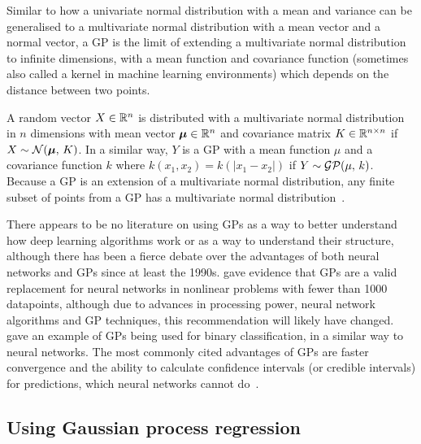 Similar to how a univariate normal distribution with a mean and variance can be generalised to a multivariate normal distribution with a mean vector and a normal vector, a \ac{GP} is the limit of extending a multivariate normal distribution to infinite dimensions, with a mean function and covariance function (sometimes also called a kernel in machine learning environments) which depends on the distance between two points.

A random vector \(X \in \mathbb{R}{}^n\) is distributed with a multivariate normal distribution in \(n\) dimensions with mean vector \(\bm{\mu} \in \mathbb{R}{}^n\) and covariance matrix \(K \in \mathbb{R}^{n \times n}\) if \(X \sim \mathcal{N}(\bm{\mu},\, K)\).
In a similar way, \(Y\) is a \ac{GP} with a mean function \(\mu\) and a covariance function \(k\) where \(k(x_1, x_2) = k(\left|x_1 - x_2\right|)\) if \(Y \sim \mathcal{GP}(\mu,\, k)\).
Because a \ac{GP} is an extension of a multivariate normal distribution, any finite subset of points from a \ac{GP} has a multivariate normal distribution~\autocite[515]{williams1996}.

There appears to be no literature on using \acp{GP} as a way to better understand how deep learning algorithms work or as a way to understand their structure, although there has been a fierce debate over the advantages of both neural networks and \acp{GP} since at least the 1990s.
\textcite[65--66]{rasmussen1997} gave evidence that \acp{GP} are a valid replacement for neural networks in nonlinear problems with fewer than 1000 datapoints, although due to advances in processing power, neural network algorithms and \ac{GP} techniques, this recommendation will likely have changed.
\textcite[25]{mackay1997} gave an example of \acp{GP} being used for binary classification, in a similar way to neural networks.
The most commonly cited advantages of \acp{GP} are faster convergence and the ability to calculate confidence intervals (or credible intervals) for predictions, which neural networks cannot do~\autocite{herbrich2003}.

\subsection{Using Gaussian process regression}

